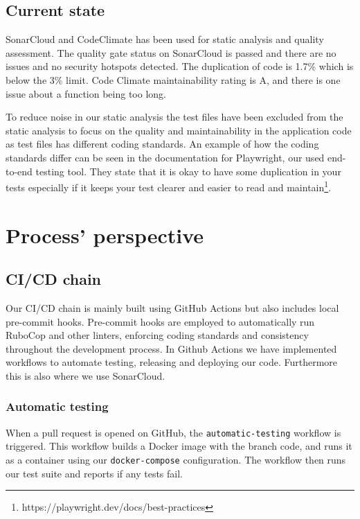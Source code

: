 \documentclass{article}
\begin{document}
\subsection{Current state}
SonarCloud and CodeClimate has been used for static analysis and quality assessment. 
The quality gate status on SonarCloud is passed and there are no issues and no security hotspots detected. The duplication of code is 1.7\% which is below the 3\% limit. Code Climate maintainability rating is A, and there is one issue about a function being too long. 

To reduce noise in our static analysis the test files have been excluded from the static analysis to focus on the quality and maintainability in the application code as test files has different coding standards. An example of how 
the coding standards differ can be seen in the documentation for Playwright, our used end-to-end testing tool. They state that it is okay to have some duplication in your tests especially if it keeps your test clearer and easier to read and maintain\footnote{https://playwright.dev/docs/best-practices}. 


\section{Process' perspective}

\subsection{CI/CD chain}
Our CI/CD chain is mainly built using GitHub Actions but also includes local pre-commit hooks. Pre-commit hooks are employed to automatically run RuboCop and other linters, enforcing coding standards and consistency throughout the development process. 
In Github Actions we have implemented workflows to automate testing, releasing and deploying our code. Furthermore this is also where we use SonarCloud.

\subsubsection{Automatic testing}
When a pull request is opened on GitHub, the \texttt{automatic-testing} workflow is triggered. This workflow builds a Docker image with the branch code, and runs it as a container using our \texttt{docker-compose} configuration. The workflow then runs our test suite and reports if any tests fail.
\end{document}
